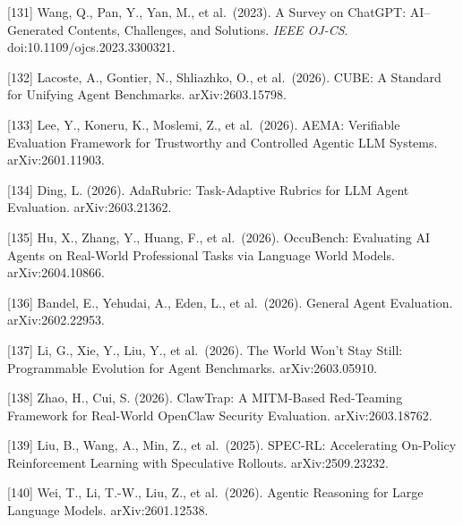 {[}131{]} Wang, Q., Pan, Y., Yan, M., et al.~(2023). A Survey on ChatGPT: AI--Generated Contents, Challenges, and Solutions. \emph{IEEE OJ-CS}. doi:10.1109/ojcs.2023.3300321.

{[}132{]} Lacoste, A., Gontier, N., Shliazhko, O., et al.~(2026). CUBE: A Standard for Unifying Agent Benchmarks. arXiv:2603.15798.

{[}133{]} Lee, Y., Koneru, K., Moslemi, Z., et al.~(2026). AEMA: Verifiable Evaluation Framework for Trustworthy and Controlled Agentic LLM Systems. arXiv:2601.11903.

{[}134{]} Ding, L. (2026). AdaRubric: Task-Adaptive Rubrics for LLM Agent Evaluation. arXiv:2603.21362.

{[}135{]} Hu, X., Zhang, Y., Huang, F., et al.~(2026). OccuBench: Evaluating AI Agents on Real-World Professional Tasks via Language World Models. arXiv:2604.10866.

{[}136{]} Bandel, E., Yehudai, A., Eden, L., et al.~(2026). General Agent Evaluation. arXiv:2602.22953.

{[}137{]} Li, G., Xie, Y., Liu, Y., et al.~(2026). The World Won't Stay Still: Programmable Evolution for Agent Benchmarks. arXiv:2603.05910.

{[}138{]} Zhao, H., Cui, S. (2026). ClawTrap: A MITM-Based Red-Teaming Framework for Real-World OpenClaw Security Evaluation. arXiv:2603.18762.

{[}139{]} Liu, B., Wang, A., Min, Z., et al.~(2025). SPEC-RL: Accelerating On-Policy Reinforcement Learning with Speculative Rollouts. arXiv:2509.23232.

{[}140{]} Wei, T., Li, T.-W., Liu, Z., et al.~(2026). Agentic Reasoning for Large Language Models. arXiv:2601.12538.
